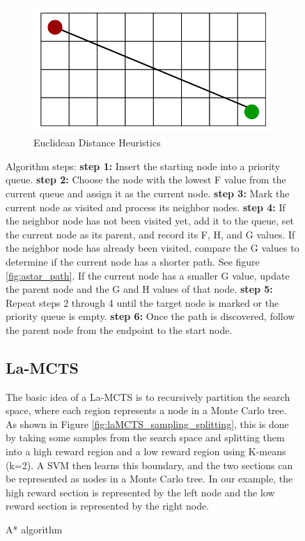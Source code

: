 \documentclass[bibliography=totoc]{scrartcl}
\begin{document}
\begin{figure}[H]
\begin{subfigure}[b]{0.3\linewidth}
    \end{subfigure}
	\hspace{0.02\textwidth}
	\begin{subfigure}[b]{0.3\linewidth}
		\includegraphics[width=\linewidth]{img/a_-search-algorithm-euclidian_distance.png}
		\caption{Euclidean Distance Heuristics}
        \label{fig:EuclideanDistanceHeuristics}
	\end{subfigure}
 	\caption{A* algorithm \cite{Pic:astar}}
	\label{fig:astar}
    \vspace{-15pt}
Algorithm steps: \cite{app9061057} \newline
\textbf{step 1:} Insert the starting node into a priority queue.
\newline
\textbf{step 2:} Choose the node with the lowest F value from the current queue and assign it as the current node.
\newline
\textbf{step 3:} Mark the current node as visited and process its neighbor nodes.
\newline
\textbf{step 4:} If the neighbor node has not been visited yet, add it to the queue, set the current node as its parent, and record its F, H, and G values.
If the neighbor node has already been visited, compare the G values to determine if the current node has a shorter path. See figure \ref{fig:astar_path}.
If the current node has a smaller G value, update the parent node and the G and H values of that node.
\newline
\textbf{step 5:} Repeat steps 2 through 4 until the target node is marked or the priority queue is empty.
\newline
\textbf{step 6:} Once the path is discovered, follow the parent node from the endpoint to the start node.

\newpage
\subsection{La-MCTS}
The basic idea of a \ac{La-MCTS} is to recursively partition the search space, where each region represents a node in a Monte Carlo tree.\cite{La-MCTS}
As shown in Figure \ref{fig:laMCTS_sampling_splitting}, this is done by taking some samples from the search space and splitting them into a high reward region and a low reward region using K-means (k=2).
A \ac{SVM} then learns this boundary, and the two sections can be represented as nodes in a Monte Carlo tree.
In our example, the high reward section is represented by the left node and the low reward section is represented by the right node.



\end{figure}
\end{document}
